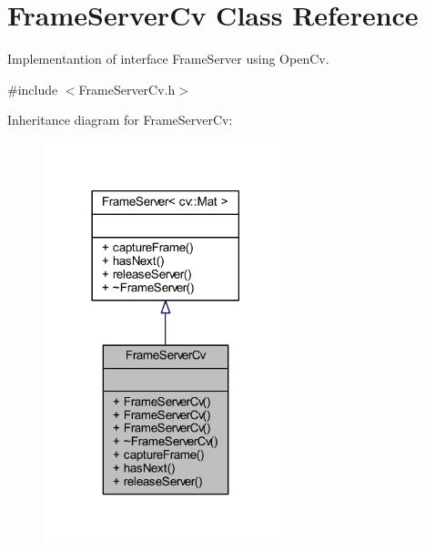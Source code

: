 \hypertarget{class_viscv_1_1_frame_server_cv}{}\section{Frame\+Server\+Cv Class Reference}
\label{class_viscv_1_1_frame_server_cv}


Implementantion of interface Frame\+Server using Open\+Cv.  




{\ttfamily \#include $<$Frame\+Server\+Cv.\+h$>$}



Inheritance diagram for Frame\+Server\+Cv\+:
\nopagebreak
\begin{figure}[H]
\begin{center}
\leavevmode
\includegraphics[width=201pt]{class_viscv_1_1_frame_server_cv__inherit__graph}
\end{center}
\end{figure}


